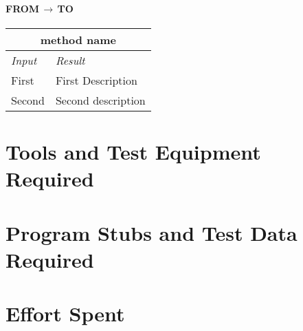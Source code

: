 \documentclass[11pt,a4paper]{report}
\begin{document}
\subsubsection{FROM$\,\to\,$TO}
\begin{tabularx}{\textwidth}{|X|X|}
	\hline
	\multicolumn{2}{|c|}{\textbf{method name}}\\
	\hline
	\textit{Input} & \textit{Result}\\
	\hline
	First & First Description\\
	\hline
	Second & Second description\\
	\hline
\end{tabularx}
\chapter{Tools and Test Equipment Required}
\chapter{Program Stubs and Test Data Required}
\chapter{Effort Spent}
\end{document}
